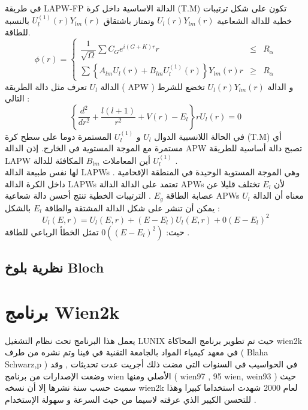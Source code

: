 في طريقة LAPW-FP الدالة الاساسية داخل كرة (T.M) تكون على شكل ترتيبات خطية للدالة الشعاعية $  U_{l} (r) Y_{lm} (r) $ وتمتاز باشتقاق $  U_{l}^{(1)} (r) Y_{lm} (r) $ بالنسبة للطاقة.
\begin{equation}\label{key}
	\phi(r) = \left\{\begin{array}{rcl} 
		\dfrac{1}{\sqrt\Omega} \sum C_{G} e^{i(G+K)r}    r & \leq & R_{\alpha}\\
		\sum \left\{A_{lm} U_{l}(r) + B_{lm} U_{l}^{(1)} (r)  \right\} Y_{lm} (r)    r & \geq & R_{\alpha}
	\end{array} \right.
\end{equation}
الدالة $ U_{l} $ تعرف مثل دالة الطريقة ( APW ) و الدالة $  U_{l} (r) Y_{lm} (r) $ تخضع للشرط التالي :
\begin{equation}\label{}
	\left\{\frac{d^{2}}{dr^{2}} + \dfrac{l(l+1)}{r^{2}} + V(r) - E_{l} \right\} r U_{l} (r) = 0 
\end{equation}
في الحالة اللانسبية الدوال $ U_{l} $ و $ U_{l}^{(1)} $ المستمرة دوما على سطح كرة (T.M) أي مستمرة مع الموجة المستوية في الخارج. إذن  الدالة APW تصبح دالة أساسية للطريقة  LAPW أين المعاملات $ B_{lm} $ المكافئة للدالة $ U_{l}^{(1)} $ .\\
لها نفس طبيعة الدالة LAPWs وهي الموجة المستوية الوحيدة في المنطقة الإقحامية . داخل الكرة الدالة LAPWs تعتمد على الدالة الدالة APWs لأن  $ E_{l} $ تختلف قليلا عن عصابة الطاقة $ E_{g} $ . الترتيبات الخطية تنتج أحسن دالة شعاعية APWs معناه أن الدالة $ U_{l} $ يمكن أن تنشر على شكل الدالة المشتقة والطاقة $ E_{l} $ بالشكل :
\begin{equation}\label{}
	U_{l}(E,r) = U_{l}(E,r) + (E - E_{l}) U_{l} (E,r) + 0 (E - E_{l})^{2}
\end{equation}
حيث: $ 0((E - E_{l})^{2}) $ تمثل الخطأ الرباعي للطاقة . \cite{b5}

\subsection{ نظرية بلوخ Bloch }


\section{ برنامج Wien2k }

يعمل هذا البرنامج تحت نظام التشغيل LUNIX حيث تم  تطوير برنامج المحاكاة  wien2k  في معهد كيمياء المواد بالجامعة التقنية في فينا وتم  نشره من طرف ( Blaha Schwarz,p ) في الحواسيب في السنوات التي مضت ذلك أجريت عدت تحديثات , وقد وضعت الإصدارات من برنامج wien الأصلي ومنها ( wien97 , 95 wien, wein93 ) حيث سميت حسب سنة نشرها إلا أن نسخه  wien2k لعام  2000 شهدت استخداما كبيرا وهذا للتحسن الكيبر الذي عرفته لاسيما من حيث السرعة و سهولة الإستخدام .\cite{b1}


